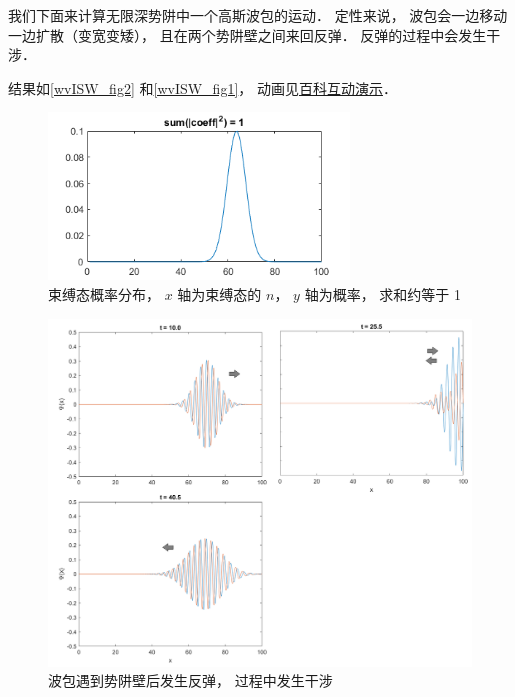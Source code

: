 

我们下面来计算无限深势阱中一个高斯波包的运动． 定性来说， 波包会一边移动一边扩散（变宽变矮）， 且在两个势阱壁之间来回反弹． 反弹的过程中会发生干涉．

结果如\autoref{wvISW_fig2} 和\autoref{wvISW_fig1}， 动画见\href{http://wuli.wiki/apps/wvISW.html}{百科互动演示}．

\begin{figure}[ht]
\centering
\includegraphics[width=8cm]{./figures/wvISW_2.png}
\caption{束缚态概率分布， $x$ 轴为束缚态的 $n$， $y$ 轴为概率， 求和约等于 1} \label{wvISW_fig2}
\end{figure}

\begin{figure}[ht]
\centering
\includegraphics[width=15cm]{./figures/wvISW_1.png}
\caption{波包遇到势阱壁后发生反弹， 过程中发生干涉} \label{wvISW_fig1}
\end{figure}

